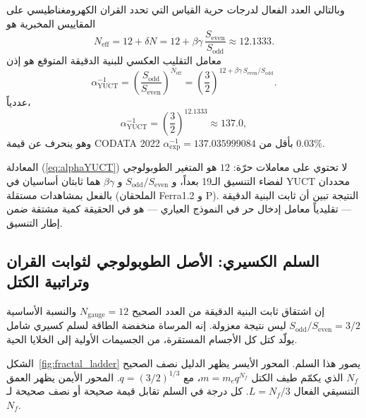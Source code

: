 \documentclass[12pt,a4paper]{article}
\begin{document}
	وبالتالي العدد الفعال لدرجات حرية القياس التي تحدد القران الكهرومغناطيسي على المقاييس المخبرية هو
	\begin{equation}
		N_{\mathrm{eff}} = 12 + \delta N = 12 + \beta\gamma\,\frac{S_{\mathrm{even}}}{S_{\mathrm{odd}}} \approx 12.1333 .
	\end{equation}
	معامل التقليب العكسي للبنية الدقيقة المتوقع هو إذن
	\begin{equation}
		\boxed{\alpha^{-1}_{\mathrm{YUCT}} = \left( \frac{S_{\mathrm{odd}}}{S_{\mathrm{even}}} \right)^{N_{\mathrm{eff}}}
			= \left( \frac{3}{2} \right)^{12 + \beta\gamma\,S_{\mathrm{even}}/S_{\mathrm{odd}}} } .
		\label{eq:alphaYUCT}
	\end{equation}
	عددياً،
	\[
	\alpha^{-1}_{\mathrm{YUCT}} = \left( \frac{3}{2} \right)^{12.1333} \approx 137.0 ,
	\]
	وهو ينحرف عن قيمة CODATA 2022 \(\alpha^{-1}_{\mathrm{exp}} = 137.035999084\) بأقل من \(0.03\%\).
	
	المعادلة (\ref{eq:alphaYUCT}) لا تحتوي على معاملات حرّة: \(12\) هو المتغير الطوبولوجي لفضاء التنسيق الـ19 بعداً، و \(S_{\mathrm{odd}}/S_{\mathrm{even}}\) و \(\beta\gamma\) هما ثابتان أساسيان في YUCT محددان بالفعل بمشاهدات مستقلة (الملحقان Ferra1.2 و P). النتيجة تبين أن ثابت البنية الدقيقة — تقليدياً معامل إدخال حر في النموذج العياري — هو في الحقيقة كمية مشتقة ضمن إطار التنسيق.
	
	\subsection{السلم الكسيري: الأصل الطوبولوجي لثوابت القران وتراتبية الكتل}
	\label{sec:fractal_ladder}
	
	إن اشتقاق ثابت البنية الدقيقة من العدد الصحيح \(N_{\mathrm{gauge}}=12\) والنسبة الأساسية \(S_{\mathrm{odd}}/S_{\mathrm{even}}=3/2\) ليس نتيجة معزولة. إنه المرساة منخفضة الطاقة لسلم كسيري شامل يولّد كتل كل الأجسام المستقرة، من الجسيمات الأولية إلى الخلايا الحية.
	
	الشكل~\ref{fig:fractal_ladder} يصور هذا السلم. المحور الأيسر يظهر الدليل نصف الصحيح \(N_f\) الذي يكمّم طيف الكتل \(m = m_e q^{N_f}\)، مع \(q = (3/2)^{1/3}\). المحور الأيمن يظهر العمق التنسيقي الفعال \(L = N_f/3\). كل درجة في السلم تقابل قيمة صحيحة أو نصف صحيحة لـ \(N_f\).
	
\end{document}

